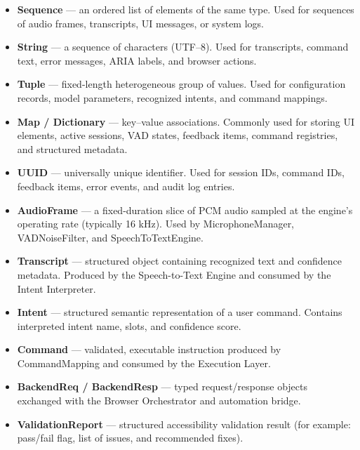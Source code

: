 \documentclass[12pt, titlepage]{article}
\begin{document}
\begin{itemize}
    \item \textbf{Sequence} — an ordered list of elements of the same type.  
    Used for sequences of audio frames, transcripts, UI messages, or system logs.

    \item \textbf{String} — a sequence of characters (UTF--8).  
    Used for transcripts, command text, error messages, ARIA labels, and browser actions.

    \item \textbf{Tuple} — fixed-length heterogeneous group of values.  
    Used for configuration records, model parameters, recognized intents, and command mappings.

    \item \textbf{Map / Dictionary} — key–value associations.  
    Commonly used for storing UI elements, active sessions, VAD states, feedback items, command registries, and structured metadata.

    \item \textbf{UUID} — universally unique identifier.  
    Used for session IDs, command IDs, feedback items, error events, and audit log entries.

    \item \textbf{AudioFrame} — a fixed-duration slice of PCM audio sampled at the engine’s operating rate (typically 16 kHz).  
    Used by MicrophoneManager, VADNoiseFilter, and SpeechToTextEngine.

    \item \textbf{Transcript} — structured object containing recognized text and confidence metadata.  
    Produced by the Speech-to-Text Engine and consumed by the Intent Interpreter.

    \item \textbf{Intent} — structured semantic representation of a user command.  
    Contains interpreted intent name, slots, and confidence score.

    \item \textbf{Command} — validated, executable instruction produced by CommandMapping and consumed by the Execution Layer.

    \item \textbf{BackendReq / BackendResp} — typed request/response objects exchanged with the Browser Orchestrator and automation bridge.

    \item \textbf{ValidationReport} — structured accessibility validation result (for example: pass/fail flag, list of issues, and recommended fixes).
\end{itemize}
\end{document}
